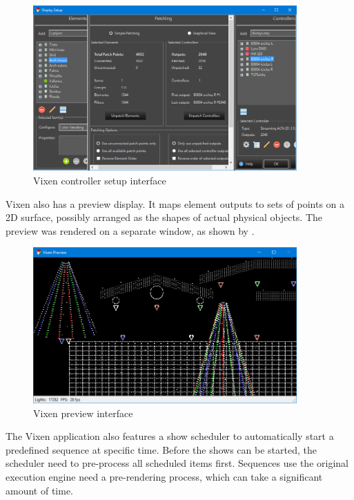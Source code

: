 \begin{figure}[!t]
  \centering
  \includegraphics[width=0.9\textwidth]{Figs//vixen_setup.png}
  \caption{\footnotesize Vixen controller setup interface}
  \label{fig:vixen-setup}
\end{figure}

Vixen also has a preview display. It maps element outputs to sets of points on a 2D surface, possibly arranged as the shapes of actual physical objects. The preview was rendered on a separate window, as shown by .

\begin{figure}[!t]
  \centering
  \includegraphics[width=0.9\textwidth]{Figs//vixen_preview.png}
  \caption{\footnotesize Vixen preview interface}
  \label{fig:vixen-preview}
\end{figure}

The Vixen application also features a show scheduler to automatically start a predefined sequence at specific time. Before the shows can be started, the scheduler need to pre-process all scheduled items first. Sequences use the original execution engine need a pre-rendering process, which can take a significant amount of time.

